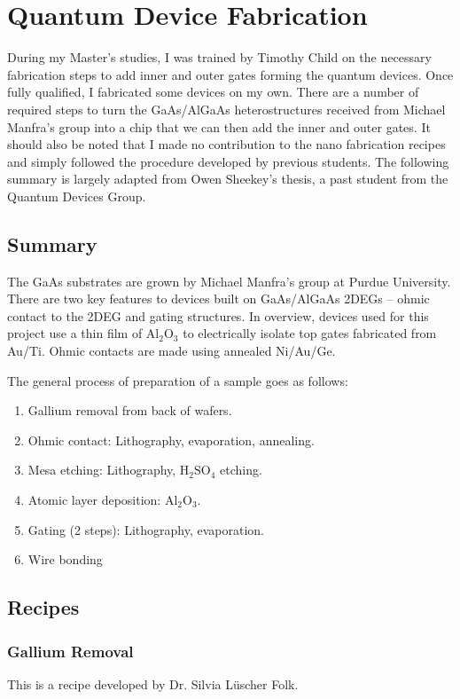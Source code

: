 \chapter{Quantum Device Fabrication}\label{cha:appendix1}


During my Master's studies, I was trained by Timothy Child on the necessary fabrication steps to add inner and outer gates forming the quantum devices. Once fully qualified, I fabricated some devices on my own. There are a number of required steps to turn the GaAs/AlGaAs heterostructures received from Michael Manfra's group into a chip that we can then add the inner and outer gates. It should also be noted that I made no contribution to the nano fabrication recipes and simply followed the procedure developed by previous students. The following summary is largely adapted from Owen Sheekey's thesis, a past student from the Quantum Devices Group. 

\section{Summary}
The GaAs substrates are grown by Michael Manfra’s group at Purdue University. There are two key features to devices built on GaAs/AlGaAs 2DEGs – ohmic contact to the 2DEG and gating structures. In overview, devices used for this project use a thin film of $\mathrm{Al_2O_3}$ to electrically isolate top gates fabricated from Au/Ti. Ohmic contacts are made using annealed Ni/Au/Ge.

The general process of preparation of a sample goes as follows:

\begin{enumerate}
\item Gallium removal from back of wafers.
\item Ohmic contact: Lithography, evaporation, annealing.
\item Mesa etching: Lithography, $\mathrm{H_2SO_4}$ etching.
\item Atomic layer deposition: $\mathrm{Al_2O_3}$.
\item Gating (2 steps): Lithography, evaporation.
\item Wire bonding
\end{enumerate}

\section{Recipes}

\subsection{Gallium Removal}
This is a recipe developed by Dr. Silvia Lüscher Folk.



